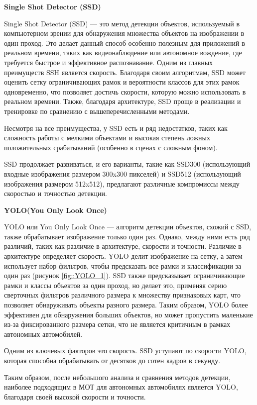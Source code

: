 \textbf{Single Shot Detector (SSD)}

Single Shot Detector (SSD) --- это метод детекции объектов, используемый в компьютерном зрении для обнаружения множества объектов на изображении в один проход. Это делает данный способ особенно полезным для приложений в реальном времени, таких как видеонаблюдение или автономное вождение, где требуется быстрое и эффективное распознавание. Одним из главных преимуществ SSH является скорость. Благодаря своим алгоритмам, SSD может оценить сетку ограничивающих рамок и вероятности классов для этих рамок одновременно, что позволяет достичь скорости, которую можно использовать в реальном времени. Также, благодаря архитектуре, SSD проще в реализации и тренировке по сравнению с вышеперечисленными методами.

Несмотря на все преимущества, у SSD есть и ряд недостатков, таких как сложность работы с мелкими объектами и высокая степень ложных положительных срабатываний (особенно в сценах с сложным фоном).

SSD продолжает развиваться, и его варианты, такие как SSD300 (использующий входные изображения размером 300x300 пикселей) и SSD512 (использующий изображения размером 512x512), предлагают различные компромиссы между скоростью и точностью детекции.

\textbf{YOLO(You Only Look Once)}

YOLO или You Only Look Once --- алгоритм детекции объектов, схожий с SSD, также обрабатывает изображение только один раз. Однако, между ними есть ряд различий, таких как различие в архитектуре, скорости и точности. Различие в архитектуре определяет скорость. YOLO делит изображение на сетку, а затем использует набор фильтров, чтобы предсказать все рамки и классификации за один раз (рисунок \ref{fig::YOLO_1}). SSD также предсказывает ограничивающие рамки и классы объектов за один проход, но делает это, применяя серию сверточных фильтров различного размера к множеству признаковых карт, что позволяет обнаруживать объекты разного размера. Таким образом, YOLO более эффективен для обнаружения больших объектов, но может пропустить маленькие из-за фиксированного размера сетки, что не является критичным в рамках автономных автомобилей. 


Одним из ключевых факторов это скорость. SSD уступают по скорости YOLO, которая способна обрабатывать от десятков до сотен кадров в секунду. 

Таким образом, после небольшого анализа и сравнения методов детекции, наиболее подходящим  в МОТ для автономных автомобилях является YOLO, благодаря своей высокой скорости и точности.

